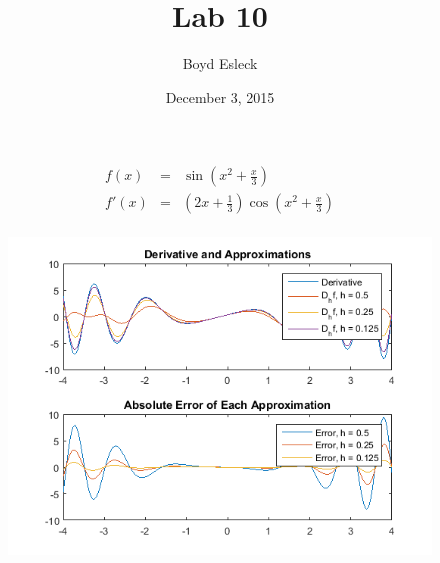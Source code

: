 \documentclass[10pt,letterpaper]{article}
\begin{document}
\title{Lab 10}
\date{December 3, 2015}
\author{Boyd Esleck}

\begin{eqnarray*}
f(x) &=& \sin\left(x^2 + \frac{x}{3}\right) \\
f'(x) &=& \left(2x + \frac{1}{3}\right)\cos\left(x^2 + \frac{x}{3}\right)  \\
\end{eqnarray*}


\begin{figure}
\includegraphics[width=\textwidth]{untitled}
\end{figure}
\FloatBarrier


\vspace{.25 in}
\hrulefill
\vspace{.25 in}

\end{document}
